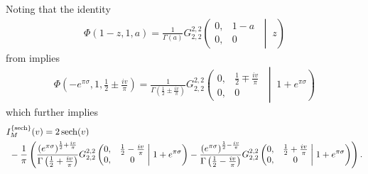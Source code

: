 Noting that the identity
\begin{align}
	\Phi\left(1-z, 1, a\right)
	= \frac{1}{\Gamma(a)}
	G_{2,2}^{2,2}
	\left(
	\begin{matrix}
		0, & 1-a \\
		0, & 0
	\end{matrix}\;\middle|\;z
	\right)
\end{align}
from \cite{prudnikov_integrals_2003} implies
\begin{align}
	\Phi\left(-e^{\pi\sigma}, 1, \frac{1}{2} \pm \frac{iv}{\pi}\right)
	= \frac{1}{\Gamma\left(\frac{1}{2} \pm \frac{iv}{\pi}\right)}
	G_{2,2}^{2,2}
	\left(
	\begin{matrix}
		0, & \frac{1}{2} \mp \frac{iv}{\pi}\\
		0, & 0
	\end{matrix}\;\middle|\; 1 + e^{\pi\sigma}
	\right)
\end{align}
which further implies
\begin{align}
	\begin{split}
		&I_M^{\{\operatorname{sech}\}}(v) = 2 \operatorname{sech}(v) \\
		&\ - \frac{1}{\pi}\left(
		\frac{\left(e^{\pi\sigma}\right)^{\frac{1}{2}+\frac{iv}{\pi}}}{\Gamma\left(\frac{1}{2} + \frac{iv}{\pi}\right)}
		G_{2,2}^{2,2}
		\left(
		\begin{matrix}
			0, & \frac{1}{2} - \frac{iv}{\pi}\\
			0, & 0
		\end{matrix}\;\middle|\; 1 + e^{\pi\sigma}
		\right)
		-
		\frac{\left(e^{\pi\sigma}\right)^{\frac{1}{2}-\frac{iv}{\pi}}}{\Gamma\left(\frac{1}{2} - \frac{iv}{\pi}\right)}
		G_{2,2}^{2,2}
		\left(
		\begin{matrix}
			0, & \frac{1}{2} + \frac{iv}{\pi}\\
			0, & 0
		\end{matrix}\;\middle|\; 1 + e^{\pi\sigma}
		\right)
		\right).
	\end{split}
\end{align}

